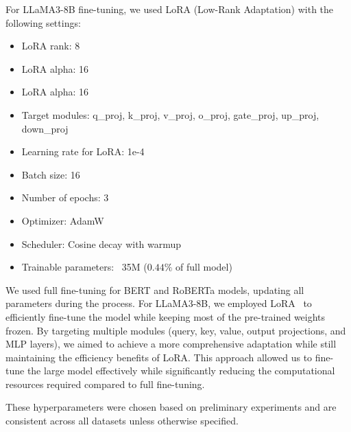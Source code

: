 For LLaMA3-8B fine-tuning, we used LoRA (Low-Rank Adaptation) with the following settings:
\begin{itemize}[leftmargin=*]
    \item LoRA rank: 8
    \item LoRA alpha: 16
    \item LoRA alpha: 16
    \item Target modules: q\_proj, k\_proj, v\_proj, o\_proj, gate\_proj, up\_proj, down\_proj
    \item Learning rate for LoRA: 1e-4
    \item Batch size: 16
    \item Number of epochs: 3
    \item Optimizer: AdamW
    \item Scheduler: Cosine decay with warmup
    \item Trainable parameters: ~35M ($0.44\%$ of full model)
\end{itemize}
We used full fine-tuning for BERT and RoBERTa models, updating all parameters during the process. For LLaMA3-8B, we employed LoRA~\citep{hulora} to efficiently fine-tune the model while keeping most of the pre-trained weights frozen. By targeting multiple modules (query, key, value, output projections, and MLP layers), we aimed to achieve a more comprehensive adaptation while still maintaining the efficiency benefits of LoRA. This approach allowed us to fine-tune the large model effectively while significantly reducing the computational resources required compared to full fine-tuning.

These hyperparameters were chosen based on preliminary experiments and are consistent across all datasets unless otherwise specified.

